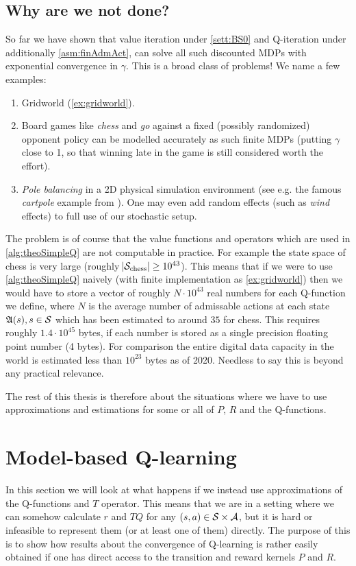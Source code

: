 \subsection{Why are we not done?}

So far we have shown that value iteration under \cref{sett:BS0}
and Q-iteration under additionally \cref{asm:finAdmAct}, can solve
all such discounted MDPs with exponential convergence in $\gamma$.
This is a broad class of problems!
We name a few examples:
\begin{enumerate}
  \item Gridworld (\cref{ex:gridworld}).
  \item Board games like \emph{chess} and \emph{go}
    against a fixed (possibly randomized) opponent policy
    can be modelled accurately
    as such finite MDPs (putting $\gamma$ close to 1, so that winning late in 
    the game is still considered worth the effort).
  \item \emph{Pole balancing} in a 2D physical simulation environment
    (see e.g. the famous \emph{cartpole} example from ).
    One may even add random effects (such as \emph{wind} effects)
    to full use of our stochastic setup.
\end{enumerate}
The problem is of course that the value functions and operators
which are used in \cref{alg:theoSimpleQ} are not computable in practice.
For example the state space of chess is very large
(roughly $\abs{\mathcal{S}_{\mathrm{chess}}} \geq 10^{43}$).
This means that if we were to use \cref{alg:theoSimpleQ} naively
(with finite implementation as \cref{ex:gridworld})
then we would have to store a vector of
roughly $N \cdot 10^{43}$ real numbers for each Q-function we define,
where $N$ is the average number of admissable actions at each state
$\frak{A}(s), s \in \mathcal{S}$
which has been estimated to around $35$ for chess.
This requires roughly $1.4 \cdot 10^{45}$ bytes, if each number is stored as a
single precision floating point number (4 bytes).
For comparison the entire digital data capacity in the world is estimated
less than $10^{23}$ bytes as of 2020.
Needless to say this is beyond any practical relevance.

The rest of this thesis is therefore about the situations where we have
to use approximations and estimations for some or all of $P$, $R$ and
the Q-functions.

\section{Model-based Q-learning}
In this section we will look at what happens if we
instead use approximations of the Q-functions and $T$ operator.
This means that we are in a setting where we can somehow
calculate $r$ and $TQ$ for any $(s,a) \in \mathcal{S} \times \mathcal{A}$,
but it is hard or infeasible to represent them (or at least one of them)
directly.
The purpose of this is to show how results about the convergence of Q-learning
is rather easily obtained if one has direct access
to the transition and reward kernels $P$ and $R$.

